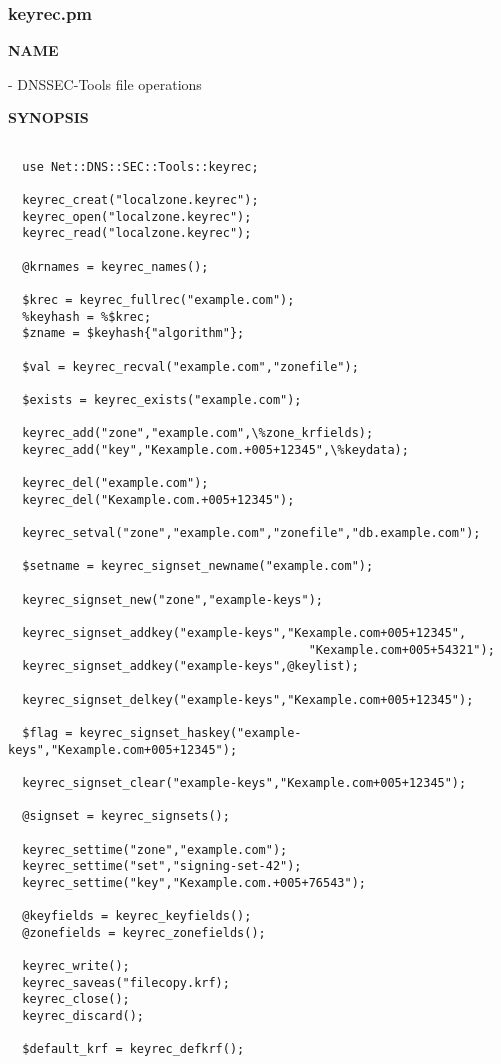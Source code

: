 \clearpage

\subsubsection{keyrec.pm}

{\bf NAME}

 - DNSSEC-Tools 
file operations

{\bf SYNOPSIS}

\begin{verbatim}

  use Net::DNS::SEC::Tools::keyrec;

  keyrec_creat("localzone.keyrec");
  keyrec_open("localzone.keyrec");
  keyrec_read("localzone.keyrec");

  @krnames = keyrec_names();

  $krec = keyrec_fullrec("example.com");
  %keyhash = %$krec;
  $zname = $keyhash{"algorithm"};

  $val = keyrec_recval("example.com","zonefile");

  $exists = keyrec_exists("example.com");

  keyrec_add("zone","example.com",\%zone_krfields);
  keyrec_add("key","Kexample.com.+005+12345",\%keydata);

  keyrec_del("example.com");
  keyrec_del("Kexample.com.+005+12345");

  keyrec_setval("zone","example.com","zonefile","db.example.com");

  $setname = keyrec_signset_newname("example.com");

  keyrec_signset_new("zone","example-keys");

  keyrec_signset_addkey("example-keys","Kexample.com+005+12345",
                                          "Kexample.com+005+54321");
  keyrec_signset_addkey("example-keys",@keylist);

  keyrec_signset_delkey("example-keys","Kexample.com+005+12345");

  $flag = keyrec_signset_haskey("example-keys","Kexample.com+005+12345");

  keyrec_signset_clear("example-keys","Kexample.com+005+12345");

  @signset = keyrec_signsets();

  keyrec_settime("zone","example.com");
  keyrec_settime("set","signing-set-42");
  keyrec_settime("key","Kexample.com.+005+76543");

  @keyfields = keyrec_keyfields();
  @zonefields = keyrec_zonefields();

  keyrec_write();
  keyrec_saveas("filecopy.krf);
  keyrec_close();
  keyrec_discard();

  $default_krf = keyrec_defkrf();

\end{verbatim}

